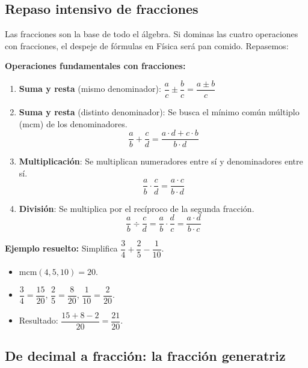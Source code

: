 \documentclass[12pt, letterpaper]{article}
\begin{document}
\subsection{Repaso intensivo de fracciones}

Las fracciones son la base de todo el álgebra. Si dominas las cuatro operaciones con fracciones, el despeje de fórmulas en Física será pan comido. Repasemos:

\begin{cuadrosolucion}
  \textbf{Operaciones fundamentales con fracciones:}
  \begin{enumerate}[leftmargin=*, label=\arabic*.]
    \item \textbf{Suma y resta} (mismo denominador): $\dfrac{a}{c} \pm \dfrac{b}{c} = \dfrac{a \pm b}{c}$

    \item \textbf{Suma y resta} (distinto denominador): Se busca el mínimo común múltiplo (mcm) de los denominadores.
          $$\frac{a}{b} + \frac{c}{d} = \frac{a \cdot d + c \cdot b}{b \cdot d}$$

    \item \textbf{Multiplicación}: Se multiplican numeradores entre sí y denominadores entre sí.
          $$\frac{a}{b} \cdot \frac{c}{d} = \frac{a \cdot c}{b \cdot d}$$

    \item \textbf{División}: Se multiplica por el recíproco de la segunda fracción.
          $$\frac{a}{b} \div \frac{c}{d} = \frac{a}{b} \cdot \frac{d}{c} = \frac{a \cdot d}{b \cdot c}$$
  \end{enumerate}
\end{cuadrosolucion}

\noindent\textbf{Ejemplo resuelto:} Simplifica $\dfrac{3}{4} + \dfrac{2}{5} - \dfrac{1}{10}$.
\begin{itemize}
  \item mcm$(4, 5, 10) = 20$.
  \item $\dfrac{3}{4} = \dfrac{15}{20}$, \quad $\dfrac{2}{5} = \dfrac{8}{20}$, \quad $\dfrac{1}{10} = \dfrac{2}{20}$.
  \item Resultado: $\dfrac{15 + 8 - 2}{20} = \dfrac{21}{20}$.
\end{itemize}

\subsection{De decimal a fracción: la fracción generatriz}
\end{document}
